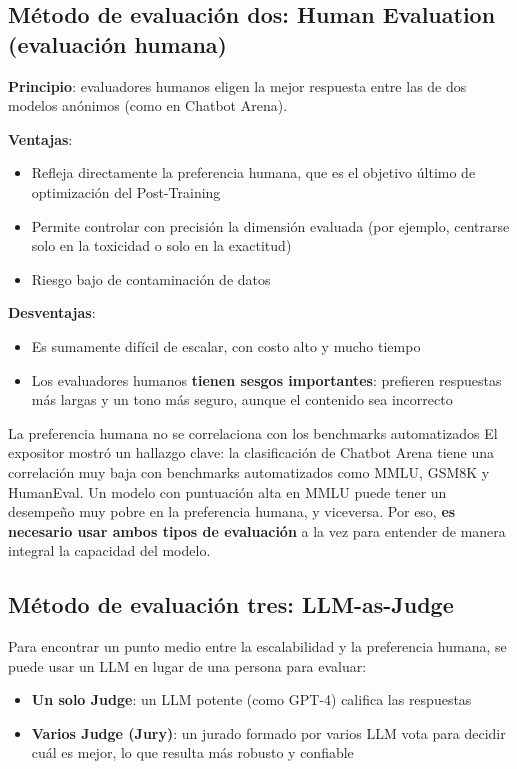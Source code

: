 \documentclass[a4paper]{article}
\begin{document}
\subsection{Método de evaluación dos: Human Evaluation (evaluación humana)}

\textbf{Principio}: evaluadores humanos eligen la mejor respuesta entre las de dos modelos anónimos (como en Chatbot Arena).

\textbf{Ventajas}:
\begin{itemize}
    \item Refleja directamente la preferencia humana, que es el objetivo último de optimización del Post-Training
    \item Permite controlar con precisión la dimensión evaluada (por ejemplo, centrarse solo en la toxicidad o solo en la exactitud)
    \item Riesgo bajo de contaminación de datos
\end{itemize}

\textbf{Desventajas}:
\begin{itemize}
    \item Es sumamente difícil de escalar, con costo alto y mucho tiempo
    \item Los evaluadores humanos \textbf{tienen sesgos importantes}: prefieren respuestas más largas y un tono más seguro, aunque el contenido sea incorrecto
\end{itemize}

\begin{warningbox}{La preferencia humana no se correlaciona con los benchmarks automatizados}
El expositor mostró un hallazgo clave: la clasificación de Chatbot Arena tiene una correlación muy baja con benchmarks automatizados como MMLU, GSM8K y HumanEval. Un modelo con puntuación alta en MMLU puede tener un desempeño muy pobre en la preferencia humana, y viceversa. Por eso, \textbf{es necesario usar ambos tipos de evaluación} a la vez para entender de manera integral la capacidad del modelo.
\end{warningbox}

\subsection{Método de evaluación tres: LLM-as-Judge}

Para encontrar un punto medio entre la escalabilidad y la preferencia humana, se puede usar un LLM en lugar de una persona para evaluar:

\begin{itemize}
    \item \textbf{Un solo Judge}: un LLM potente (como GPT-4) califica las respuestas
    \item \textbf{Varios Judge (Jury)}: un jurado formado por varios LLM vota para decidir cuál es mejor, lo que resulta más robusto y confiable
\end{itemize}
\end{document}
